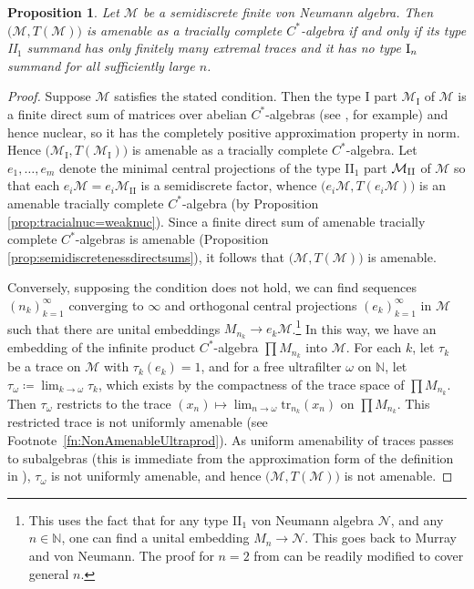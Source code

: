 \documentclass[a4paper,11pt]{amsart}
\newtheorem{proposition}[theorem]{Proposition}
\theoremstyle{definition}
\numberwithin{equation}{section}
\numberwithin{theorem}{section}
\newcommand{\N}{\mathbb N}
\newcommand{\M}{\mathcal{M}}
\begin{document}
\begin{proposition}\label{prop:vNA-non-uniform-amenable-trace}
Let $\mathcal M$ be a semidiscrete finite von Neumann algebra.  Then $\big(\mathcal M,T(\M)\big)$ is {}amenable as a tracially complete $C^*$-algebra if and only if its type {\rm II}$_1$ summand has only finitely many extremal traces and it has no type ${\rm I}_n$ summand for all sufficiently large $n$.
\end{proposition}
\begin{proof}
Suppose $\M$ satisfies the stated condition. Then the type I part $\M_{\mathrm I}$ of $\M$ is a finite direct sum of matrices over abelian $C^*$-algebras (see \cite[Theorem V.1.27]{Tak79}, for example) and hence nuclear, so it has the completely positive approximation property in norm.  Hence $\big(\M_{\mathrm I},T(\M_{\mathrm I})\big)$ is {}amenable as a tracially complete $C^*$-algebra.  Let $e_1,\dots,e_m$ denote the minimal central projections of the type II$_1$ part $\M_{\rm II}$ of $\M$  so that each $e_i \M =e_i \M_{\mathrm{II}}$ is a semidiscrete factor, whence $\big(e_i \M ,T(e_i \M )\big)$ is an {}amenable tracially complete $C^*$-algebra (by Proposition \ref{prop:tracialnuc=weaknuc}).  Since a finite direct sum of {}amenable tracially complete $C^*$-algebras is {}amenable (Proposition \ref{prop:semidiscretenessdirectsums}), it follows that $\big(\M,T(\M)\big)$ is {}amenable.

Conversely, supposing the condition does not hold, we can find  sequences $(n_k)_{k=1}^\infty$ converging to $\infty$ and orthogonal central projections $(e_k)_{k=1}^\infty$ in $\M$ such that there are unital embeddings $M_{n_k}\to e_k\M$.\footnote{This uses the fact that for any type II$_1$ von Neumann algebra $\mathcal N$, and any $n\in\mathbb N$, one can find a unital embedding $M_n\to\mathcal N$. This goes back to Murray and von Neumann. The proof for $n=2$ from \cite[Proposition V.1.35]{Tak79} can be readily modified to cover general $n$.}  In this way, we have an embedding of the infinite product $C^*$-algebra $\prod M_{n_k}$ into $\M$.  For each $k$, let $\tau_k$ be a trace on $\M$ with $\tau_k(e_k)=1$, and for a free ultrafilter $\omega$ on $\N$, let $\tau_\omega\coloneqq \lim_{k\to\omega}\tau_k$, which exists by the compactness of the trace space of $\prod M_{n_k}$.  Then $\tau_\omega$ restricts to the trace $(x_n)\mapsto \lim_{n\to\omega}\mathrm{tr}_{n_k}(x_n)$ on $\prod M_{n_k}$.  This restricted trace is not uniformly amenable (see Footnote~\ref{fn:NonAmenableUltraprod}). As uniform amenability of traces passes to subalgebras (this is immediate from the approximation form of the definition in \cite[Definition 3.2.1]{Bro06}), $\tau_\omega$ is not uniformly amenable, and hence $\big(\M,T(\M)\big)$ is not {}amenable.
\end{proof}
\end{document}

